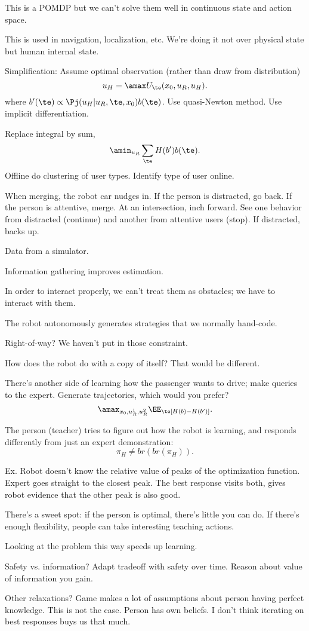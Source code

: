 This is a POMDP but we can't solve them well in continuous state and action space.

This is used in navigation, localization, etc. We're doing it not over physical state but human internal state.

Simplification: Assume optimal observation (rather than draw from distribution)
$$
u_H=\amax U_\te (x_0,u_R,u_H).
$$
where $b'(\te)\propto \Pj(u_H|u_R,\te,x_0)b(\te)$. Use quasi-Newton method. Use implicit differentiation. 

Replace integral by sum,
$$
\amin_{u_R} \sum_\te H(b')b(\te).
$$
Offline do clustering of user types. Identify type of user online.

When merging, the robot car nudges in. If the person is distracted, go back. If the person is attentive, merge. 
At an intersection, inch forward. See one behavior from distracted (continue) and another from attentive users (stop). If distracted, backs up. 

Data from a simulator.

Information gathering improves estimation.

In order to interact properly, we can't treat them as obstacles; we have to interact with them.

The robot autonomously generates strategies that we normally hand-code.

Right-of-way?  We haven't put in those constraint.

How does the robot do with a copy of itself? That would be different. %

There's another side of learning how the passenger wants to drive; make queries to the expert. Generate trajectories, which would you prefer?
$$
\amax_{x_0,u_R^1,u_R^2} \EE_\te[H(b)-H(b')].
$$

The person (teacher) tries to figure out how the robot is learning, and responds differently from just an expert demonstration:
$$
\pi_H \ne br(br(\pi_H)).
$$

Ex.  Robot doesn't know the relative value of peaks of the optimization function. Expert goes straight to the closest peak. The best response visits both, gives robot evidence that the other peak is also good.

There's a sweet spot: if the person is optimal, there's little you can do. If there's enough flexibility, people can take interesting teaching actions.

Looking at the problem this way speeds up learning.

Safety vs. information? Adapt tradeoff with safety over time. Reason about value of information you gain.

Other relaxations? Game makes a lot of assumptions about person having perfect knowledge. This is not the case. Person has own beliefs. I don't think iterating on best responses buys us that much.

